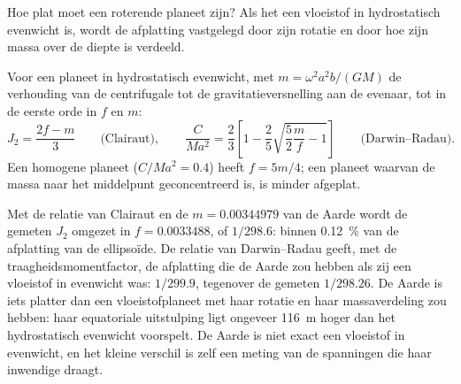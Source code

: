 Hoe plat moet een roterende planeet zijn? Als het een vloeistof in hydrostatisch
evenwicht is, wordt de afplatting vastgelegd door zijn rotatie en door hoe zijn massa
over de diepte is verdeeld.

\begin{proposition}\label{prop:b3:gravity-geodesy:clairaut}
Voor een planeet in hydrostatisch evenwicht, met $m = \omega^2a^2b/(GM)$ de verhouding
van de centrifugale tot de gravitatieversnelling aan de evenaar, tot in de eerste
orde in $f$ en $m$:
\[
  J_2 = \frac{2f - m}{3}\qquad\text{(Clairaut)},\qquad
  \frac{C}{Ma^2} = \frac23\left[1 - \frac25\sqrt{\frac52\frac mf - 1}\right]
  \qquad\text{(Darwin--Radau)} .
\]
Een homogene planeet ($C/Ma^2 = 0.4$) heeft $f = 5m/4$; een planeet waarvan de massa
naar het middelpunt geconcentreerd is, is minder afgeplat.
\end{proposition}
\admitted

Met de relatie van Clairaut en de $m = \num{0.00344979}$ van de Aarde wordt de gemeten
$J_2$ omgezet in $f = \num{0.0033488}$, of $1/298.6$: binnen
\qty{0.12}{\percent} van de afplatting van de ellipsoïde. De relatie van Darwin--Radau
geeft, met de traagheidsmomentfactor, de afplatting die de Aarde zou hebben als zij
een vloeistof in evenwicht was: $1/299.9$, tegenover de gemeten
$1/298.26$. De Aarde is iets platter dan een vloeistofplaneet met haar rotatie
en haar massaverdeling zou hebben: haar equatoriale uitstulping ligt ongeveer
\qty{116}{m} hoger dan het hydrostatisch evenwicht voorspelt. De Aarde is niet
exact een vloeistof in evenwicht, en het kleine verschil is zelf een
meting van de spanningen die haar inwendige draagt.

